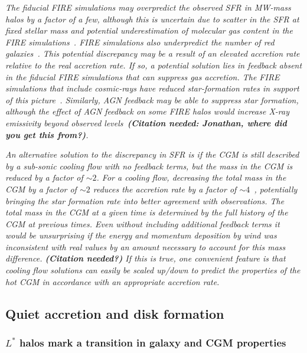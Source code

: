 \documentclass[fleqn,usenatbib]{mnras}
\begin{document}
\textit{
The fiducial FIRE simulations may overpredict the observed SFR in MW-mass halos by a factor of a few, although this is uncertain due to scatter in the SFR at fixed stellar mass and potential underestimation of molecular gas content in the FIRE simulations~\citep{Sparre2017, Orr2018}.
FIRE simulations also underpredict the number of red galaxies~\citep{Garrison-Kimmel2017}.
This potential discrepancy may be a result of an elevated accretion rate relative to the real accretion rate.
If so, a potential solution lies in feedback absent in the fiducial FIRE simulations that can suppress gas accretion.
The FIRE simulations that include cosmic-rays have reduced star-formation rates in support of this picture~\citep{Chan2019, Hopkins2020, Hopkins2020a, Hopkins2020b}.
Similarly, AGN feedback may be able to suppress star formation, although the effect of AGN feedback on some FIRE halos would increase X-ray emissivity beyond observed levels~\textbf{(Citation needed: Jonathan, where did you get this from?)}. 
}

\textit{
An alternative solution to the discrepancy in SFR is if the CGM is still described by a sub-sonic cooling flow with no feedback terms, but the mass in the CGM is reduced by a factor of  $\sim2$.
For a cooling flow, decreasing the total mass in the CGM by a factor of $\sim 2$ reduces the accretion rate by a factor of $\sim4$~\cite{Stern2019}, potentially bringing the star formation rate into better agreement with observations.
The total mass in the CGM at a given time is determined by the full history of the CGM at previous times.
Even without including additional feedback terms it would be unsurprising if the energy and momentum deposition by wind was inconsistent with real values by an amount necessary to account for this mass difference. \textbf{(Citation needed?)}
If this is true, one convenient feature is that cooling flow solutions can easily be scaled up/down to predict the properties of the hot CGM in accordance with an appropriate accretion rate.
}

\subsection{Quiet accretion and disk formation}
\label{s: discussion -- disk formation}

\subsubsection{$L^*$ halos mark a transition in galaxy and CGM properties}
\label{s: discussion -- disk formation -- transition}
\end{document}
